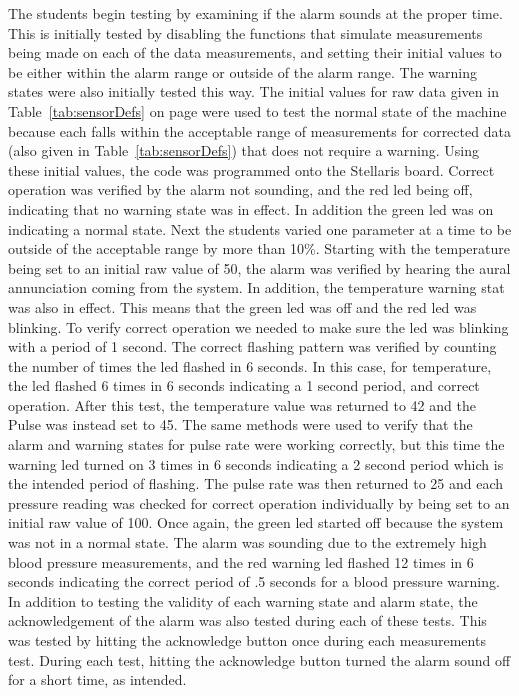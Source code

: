 \documentclass[12pt]{article} %
\begin{document}
    The students begin testing by examining if the alarm sounds at the proper time.
    This is initially tested by disabling the functions that simulate measurements
    being made on each of the data measurements, and setting their initial values
    to be either within the alarm range or outside of the alarm range. The warning
    states were also initially tested this way. The initial values for raw data
    given in Table~\ref{tab:sensorDefs} on page \pageref{tab:sensorDefs} were used
    to test the normal state of the machine because each falls within the
    acceptable range of measurements for corrected data (also given in
    Table~\ref{tab:sensorDefs}) that does not require a warning.
    Using these initial values, the code was programmed onto the Stellaris board.
    Correct operation was verified by the alarm not sounding, and the red led being
    off, indicating that no warning state was in effect. In addition the green led
    was on indicating a normal state. Next the students varied one parameter at a
    time to be outside of the acceptable range by more than 10\%. Starting with the
    temperature being set to an initial raw value of 50, the alarm was verified by
    hearing the aural annunciation coming from the system. In addition, the
    temperature warning stat was also in effect. This means that the green led was
    off and the red led was blinking. To verify correct operation we needed to make
    sure the led was blinking with a period of 1 second. The correct flashing
    pattern was verified by counting the number of times the led flashed in 6
    seconds. In this case, for temperature, the led flashed 6 times in 6 seconds
    indicating a 1 second period, and correct operation. After this test, the
    temperature value was returned to 42 and the Pulse was instead set to 45. The
    same methods were used to verify that the alarm and warning states for pulse
    rate were working correctly, but this time the warning led turned on 3 times in
    6 seconds indicating a 2 second period which is the intended period of
    flashing. The pulse rate was then returned to 25 and each pressure reading was
    checked for correct operation individually by being set to an initial raw value
    of 100. Once again, the green led started off because the system was not in a
    normal state. The alarm was sounding due to the extremely high blood pressure
    measurements, and the red warning led flashed 12 times in 6 seconds indicating
    the correct period of .5 seconds for a blood pressure warning. In addition to
    testing the validity of each warning state and alarm state, the acknowledgement
    of the alarm was also tested during each of these tests. This was tested by
    hitting the acknowledge button once during each measurements test. During each
    test, hitting the acknowledge button turned the alarm sound off for a short
    time, as intended. 
\end{document}
